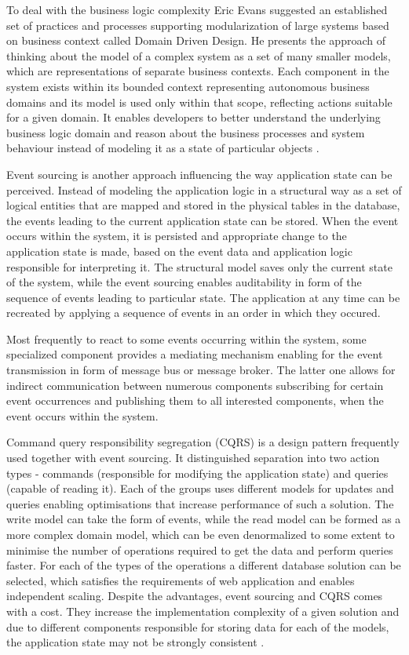 To deal with the business logic complexity Eric Evans suggested an established set of practices and processes supporting modularization of large systems based on business context called Domain Driven Design. He presents the approach of thinking about the model of a complex system as a set of many smaller models, which are representations of separate business contexts. Each component in the system exists within its bounded context representing autonomous business domains and its model is used only within that scope, reflecting actions suitable for a given domain. It enables developers to better understand the underlying business logic domain and reason about the business processes and system behaviour instead of modeling it as a state of particular objects \cite{EvansDDD}.

Event sourcing is another approach influencing the way application state can be perceived. Instead of modeling the application logic in a structural way as a set of logical entities that are mapped and stored in the physical tables in the database, the events leading to the current application state can be stored. When the event occurs within the system, it is persisted and appropriate change to the application state is made, based on the event data and application logic responsible for interpreting it. The structural model saves only the current state of the system, while the event sourcing enables auditability in form of the sequence of events leading to particular state. The application at any time can be recreated by applying a sequence of events in an order in which they occured.

Most frequently to react to some events occurring within the system, some specialized component provides a mediating mechanism enabling for the event transmission in form of message bus or message broker. The latter one allows for indirect communication between numerous components subscribing for certain event occurrences and publishing them to all interested components, when the event occurs within the system.

Command query responsibility segregation (CQRS) is a design pattern frequently used together with event sourcing. It distinguished separation into two action types - commands (responsible for modifying the application state) and queries (capable of reading it). Each of the groups uses different models for updates and queries enabling optimisations that increase performance of such a solution. The write model can take the form of events, while the read model can be formed as a more complex domain model, which can be even denormalized to some extent to minimise the number of operations required to get the data and perform queries faster. For each of the types of the operations a different database solution can be selected, which satisfies the requirements of web application and enables independent scaling. Despite the advantages, event sourcing and CQRS comes with a cost. 
They increase the implementation complexity of a given solution and due to different components responsible for storing data for each of the models, the application state may not be strongly consistent \cite{MicroservicesArchitecture}.

